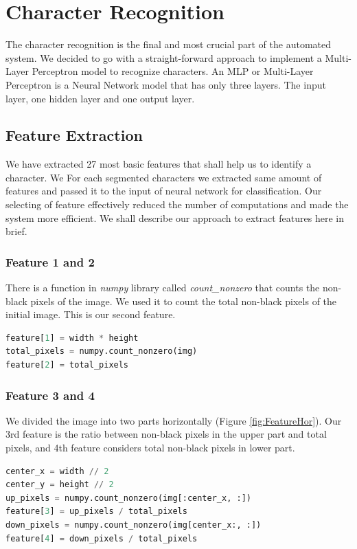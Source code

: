 \documentclass{standalone}
\begin{document}
\section{Character Recognition}
The character recognition is the final and most crucial part of the automated system. We decided to go with a straight-forward approach to implement a Multi-Layer Perceptron model to recognize characters. An MLP or Multi-Layer Perceptron is a Neural Network model that has only three layers. The input layer, one hidden layer and one output layer.

\subsection{Feature Extraction}
We have extracted 27 most basic features that shall help us to identify a character. We For each segmented characters we extracted same amount of features and passed it to the input of neural network for classification. Our selecting of feature effectively reduced the number of computations and made the system more efficient. We shall describe our approach to extract features here in brief.
\subsubsection{Feature 1 and 2}
There is a function in {\it numpy} library called {\it count\_nonzero} that counts the non-black pixels of the image. We used it to count the total non-black pixels of the initial image. This is our second feature.
\begin{lstlisting}[language=Python]
feature[1] = width * height
total_pixels = numpy.count_nonzero(img)
feature[2] = total_pixels
\end{lstlisting}

\subsubsection{Feature 3 and 4}
We divided the image into two parts horizontally (Figure \ref{fig:FeatureHor}). Our 3rd feature is the ratio between non-black pixels in the upper part and total pixels, and 4th feature considers total non-black pixels in lower part.
\begin{lstlisting}[language=Python]
center_x = width // 2
center_y = height // 2
up_pixels = numpy.count_nonzero(img[:center_x, :])
feature[3] = up_pixels / total_pixels
down_pixels = numpy.count_nonzero(img[center_x:, :])
feature[4] = down_pixels / total_pixels
\end{lstlisting}
\end{document}
